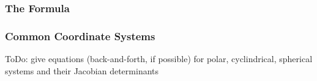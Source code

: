 \subsubsection{The Formula}

\subsubsection{Common Coordinate Systems}
ToDo: give equations (back-and-forth, if possible) for polar, cyclindrical, spherical systems and their Jacobian determinants








\begin{comment}

-Multiple integrals:
-double integrals over:
 -axis-parallel rectangles (simplest case, limits are constants)
 -triangles with two points with same y-coordinate -> y(x) is a linear function
  -can also be done using x(y) - whatever is most convenient
 -general triangles (split into two triangles of the sort above)
 -general polygons (via triangulation)
 -segments of circular annulus -> uses a coordinate transformation to polar coordinates
  -generalization to arbitrary coordinates
-triple integrals over
 -axis parallel cuboids
 -3-simplex (tetrahedron)
 -general polyeders
 -using cyclindrical, spherical and general 3D coordinates
-nD integrals
 
-line integrals (of scalar function),
-line integrals of vector fields (circulation), surface integrals (flux)
-coordinate transformations (polar, cylindricial, spherical, etc. -> jacobian determinant)
 

They don't teach this in MULTIVARIABLE CALCULUS
https://www.youtube.com/watch?v=Z7YPImc7ElE


\end{comment} 